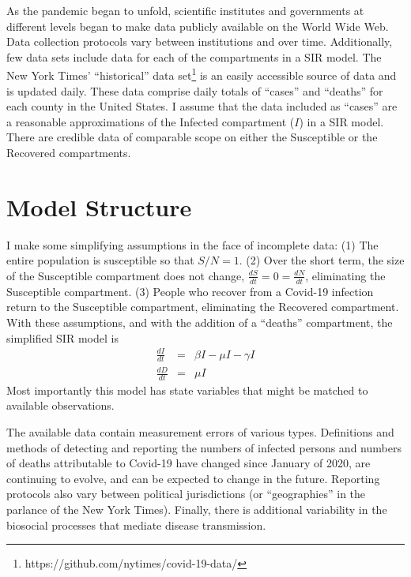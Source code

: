 \documentclass[12pt,letterpaper]{article}
\begin{document}

As the pandemic began to unfold, scientific institutes and governments
at different levels began to make data publicly available on the
World Wide Web.
Data collection protocols vary between institutions and over time. 
Additionally, few data sets include data for each of
the compartments in a SIR model. 
The New York Times' ``historical'' 
data set\footnote{\label{ff:nyt}https://github.com/nytimes/covid-19-data/}
is an easily accessible source of data and is updated daily. These data
comprise daily totals of ``cases'' and ``deaths'' for each county
in the United States. I assume that the data included as ``cases'' are
a reasonable approximations of the Infected compartment ($I$) in a SIR
model. There are credible data of comparable scope on
either the Susceptible or the Recovered compartments.

\section*{Model Structure}
I make some simplifying assumptions in the face of incomplete data: 
(1) The entire population is susceptible so that $S/N = 1$. 
(2) Over the short term, the size of the
Susceptible compartment does not change, 
$\frac{dS}{dt} = 0 = \frac{dN}{dt}$,
eliminating the Susceptible compartment.
(3) People who recover from a Covid-19 infection return to the Susceptible
compartment, eliminating the Recovered compartment. 
With these assumptions, and with the addition of a ``deaths''
compartment, the simplified SIR model is
\begin{eqnarray}
\label{eqn:sSIRI}
\frac{dI}{dt} &=&  \beta I - \mu I -\gamma I\\
\label{eqn:sSIRD}
\frac{dD}{dt} &=& \mu I
\end{eqnarray}
Most importantly this model
has state variables that might be matched to available observations.

The available data contain measurement errors of various types.
Definitions and methods of detecting and reporting the numbers of
infected persons and numbers of deaths attributable to Covid-19 have
changed since January of 2020, are continuing to evolve, and can be
expected to change in the future.
Reporting protocols also vary between political jurisdictions (or
``geographies'' in the parlance of the New York Times).
Finally, there is additional variability in the biosocial
processes that mediate disease transmission.
\end{document}
